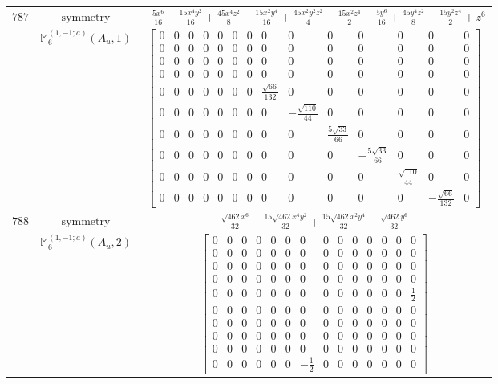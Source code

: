 \documentclass[fleqn,8pt,landscape]{jsarticle}
\begin{document}
\begin{longtable}{ccc}
$ 787 $ & $ \text{symmetry} $ & $ - \frac{5 x^{6}}{16} - \frac{15 x^{4} y^{2}}{16} + \frac{45 x^{4} z^{2}}{8} - \frac{15 x^{2} y^{4}}{16} + \frac{45 x^{2} y^{2} z^{2}}{4} - \frac{15 x^{2} z^{4}}{2} - \frac{5 y^{6}}{16} + \frac{45 y^{4} z^{2}}{8} - \frac{15 y^{2} z^{4}}{2} + z^{6} $ \\
$  $ & $ \mathbb{M}_{6}^{(1,-1;a)}(A_{u},1) $ & $ \begin{bmatrix} 0 & 0 & 0 & 0 & 0 & 0 & 0 & 0 & 0 & 0 & 0 & 0 & 0 & 0 \\ 0 & 0 & 0 & 0 & 0 & 0 & 0 & 0 & 0 & 0 & 0 & 0 & 0 & 0 \\ 0 & 0 & 0 & 0 & 0 & 0 & 0 & 0 & 0 & 0 & 0 & 0 & 0 & 0 \\ 0 & 0 & 0 & 0 & 0 & 0 & 0 & 0 & 0 & 0 & 0 & 0 & 0 & 0 \\ 0 & 0 & 0 & 0 & 0 & 0 & 0 & \frac{\sqrt{66}}{132} & 0 & 0 & 0 & 0 & 0 & 0 \\ 0 & 0 & 0 & 0 & 0 & 0 & 0 & 0 & - \frac{\sqrt{110}}{44} & 0 & 0 & 0 & 0 & 0 \\ 0 & 0 & 0 & 0 & 0 & 0 & 0 & 0 & 0 & \frac{5 \sqrt{33}}{66} & 0 & 0 & 0 & 0 \\ 0 & 0 & 0 & 0 & 0 & 0 & 0 & 0 & 0 & 0 & - \frac{5 \sqrt{33}}{66} & 0 & 0 & 0 \\ 0 & 0 & 0 & 0 & 0 & 0 & 0 & 0 & 0 & 0 & 0 & \frac{\sqrt{110}}{44} & 0 & 0 \\ 0 & 0 & 0 & 0 & 0 & 0 & 0 & 0 & 0 & 0 & 0 & 0 & - \frac{\sqrt{66}}{132} & 0 \end{bmatrix} $ \\ \hline
$ 788 $ & $ \text{symmetry} $ & $ \frac{\sqrt{462} x^{6}}{32} - \frac{15 \sqrt{462} x^{4} y^{2}}{32} + \frac{15 \sqrt{462} x^{2} y^{4}}{32} - \frac{\sqrt{462} y^{6}}{32} $ \\
$  $ & $ \mathbb{M}_{6}^{(1,-1;a)}(A_{u},2) $ & $ \begin{bmatrix} 0 & 0 & 0 & 0 & 0 & 0 & 0 & 0 & 0 & 0 & 0 & 0 & 0 & 0 \\ 0 & 0 & 0 & 0 & 0 & 0 & 0 & 0 & 0 & 0 & 0 & 0 & 0 & 0 \\ 0 & 0 & 0 & 0 & 0 & 0 & 0 & 0 & 0 & 0 & 0 & 0 & 0 & 0 \\ 0 & 0 & 0 & 0 & 0 & 0 & 0 & 0 & 0 & 0 & 0 & 0 & 0 & 0 \\ 0 & 0 & 0 & 0 & 0 & 0 & 0 & 0 & 0 & 0 & 0 & 0 & 0 & \frac{1}{2} \\ 0 & 0 & 0 & 0 & 0 & 0 & 0 & 0 & 0 & 0 & 0 & 0 & 0 & 0 \\ 0 & 0 & 0 & 0 & 0 & 0 & 0 & 0 & 0 & 0 & 0 & 0 & 0 & 0 \\ 0 & 0 & 0 & 0 & 0 & 0 & 0 & 0 & 0 & 0 & 0 & 0 & 0 & 0 \\ 0 & 0 & 0 & 0 & 0 & 0 & 0 & 0 & 0 & 0 & 0 & 0 & 0 & 0 \\ 0 & 0 & 0 & 0 & 0 & 0 & - \frac{1}{2} & 0 & 0 & 0 & 0 & 0 & 0 & 0 \end{bmatrix} $ \\ \hline

\end{longtable}
\end{document}
